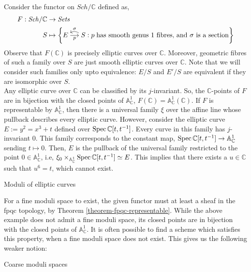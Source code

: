 \documentclass[ignorenonframetext,t]{beamer}
\newcommand{\Spec}{{\rm Spec \,}}
\newcommand{\A}{{\mathbb A}}
\newcommand{\C}{{\mathbb C}}
\theoremstyle{definition}
\begin{document}
\begin{example}
	Consider the functor on $\mathit{Sch}/\C$ defined as,
	\begin{align*}
	F: \mathit{Sch/\C} &\rightarrow \mathit{Sets}\\
	S & \mapsto \left\{
	\begin{tikzcd}[cramped, column sep=3ex, ampersand replacement=\&]
	E\arrow[r, "p"'] \& S\arrow[l, bend right, "\sigma"']
	\end{tikzcd}
	: p \;\text{has smooth genus 1 fibres, and $\sigma$ is a section}
	\right\}
	\end{align*}
	Observe that $F(\C)$ is precisely elliptic curves over $\C$. Moreover, geometric fibres of such a family over $S$ are just smooth elliptic curves over $\C$. Note that we will consider such families only upto equivalence: $E/S$ and $E'/S$ are equivalent if they are isomorphic over $S$.\\
	Any elliptic curve over $\C$ can be classified by its $j$-invariant. So, the $\C$-points of $F$ are in bijection with the closed points of $\A^1_{\C}$, $F(\C) = \A^1_{\C}(\C)$. If $F$ is representable by $\A^1_\C$, then there is a universal family $\xi$ over the affine line whose pullback  describes every elliptic curve. However, consider the elliptic curve $E:=y^2=x^3+t$ defined over $\Spec \C[t,t^{-1}]$. Every curve in this family has $j$-invariant 0. This family corresponds to the constant map, $\Spec \C[t,t^{-1}]\rightarrow \A^1_\C$ sending $t\mapsto 0$. Then, $E$ is the pullback of the universal family restricted to the point $0\in \A^1_\C$, i.e, $\xi_0\times_{\A^1_\C}{\Spec \C[t,t^{-1}]}\simeq E$. This implies that there exists a $u\in \C$ such that $u^6=t$, which cannot exist.
\end{example}

\begin{frame}
	Moduli of elliptic curves
\end{frame}

For a fine moduli space to exist, the given functor must at least a sheaf in the fpqc topology, by Theorem \ref{theorem-fpqc-representable}. While the above example does not admit a fine moduli space, its closed points are in bijection with the closed points of $\A^1_\C$. It is often possible to find a scheme which satisfies this property, when a fine moduli space does not exist. This gives us the following weaker notion:

\begin{frame}
	Coarse moduli spaces
\end{frame}
\end{document}
